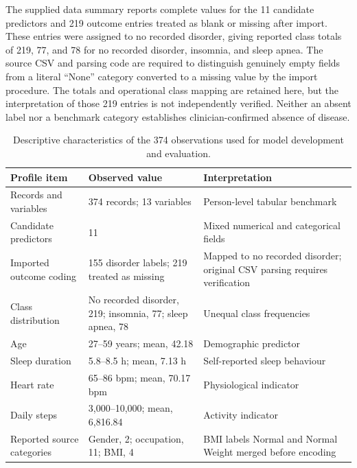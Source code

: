 \documentclass[a4paper,fleqn]{cas-dc}
\begin{document}
The supplied data summary reports complete values for the 11 candidate predictors and 219 outcome entries treated as blank or missing after import. These entries were assigned to no recorded disorder, giving reported class totals of 219, 77, and 78 for no recorded disorder, insomnia, and sleep apnea. The source CSV and parsing code are required to distinguish genuinely empty fields from a literal ``None'' category converted to a missing value by the import procedure. The totals and operational class mapping are retained here, but the interpretation of those 219 entries is not independently verified. Neither an absent label nor a benchmark category establishes clinician-confirmed absence of disease.

\begin{table}[width=\textwidth,pos=!tbp]
\centering
\caption{Descriptive characteristics of the 374 observations used for model development and evaluation.}
\label{tab:datasetprofile}
\small
\setlength{\tabcolsep}{5pt}
\renewcommand{\arraystretch}{1.05}
\begin{tabularx}{\textwidth}{@{}Q{0.25\textwidth}Q{0.27\textwidth}Y@{}}
\toprule
Profile item & Observed value & Interpretation \\
\midrule
Records and variables & 374 records; 13 variables & Person-level tabular benchmark \\
Candidate predictors & 11 & Mixed numerical and categorical fields \\
Imported outcome coding & 155 disorder labels; 219 treated as missing & Mapped to no recorded disorder; original CSV parsing requires verification \\
Class distribution & No recorded disorder, 219; insomnia, 77; sleep apnea, 78 & Unequal class frequencies \\
Age & 27--59 years; mean, 42.18 & Demographic predictor \\
Sleep duration & 5.8--8.5 h; mean, 7.13 h & Self-reported sleep behaviour \\
Heart rate & 65--86 bpm; mean, 70.17 bpm & Physiological indicator \\
Daily steps & 3,000--10,000; mean, 6,816.84 & Activity indicator \\
Reported source categories & Gender, 2; occupation, 11; BMI, 4 & BMI labels Normal and Normal Weight merged before encoding \\
\bottomrule
\end{tabularx}
\end{table}
\end{document}
